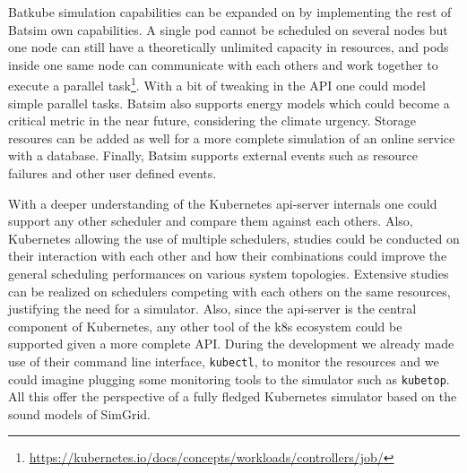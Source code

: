 Batkube simulation capabilities can be expanded on by implementing the rest of
Batsim own capabilities. A single pod cannot be scheduled on several nodes but
one node can still have a theoretically unlimited capacity in resources, and
pods inside one same node can communicate with each others and work together to
execute a parallel
task\footnote{\url{https://kubernetes.io/docs/concepts/workloads/controllers/job/}}.
With a bit of tweaking in the API one could model simple parallel tasks. Batsim
also supports energy models which could become a critical metric in the near
future, considering the climate urgency. Storage resoures can be added as well
for a more complete simulation of an online service with a database. Finally,
Batsim supports external events such as resource failures and other user
defined events.

With a deeper understanding of the Kubernetes api-server internals one could
support any other scheduler and compare them against each others. Also,
Kubernetes allowing the use of multiple schedulers, studies could be conducted
on their interaction with each other and how their combinations could improve
the general scheduling performances on various system topologies. Extensive
studies can be realized on schedulers competing with each others on the same
resources, justifying the need for a simulator. Also, since the api-server is
the central component of Kubernetes, any other tool of the k8s ecosystem could
be supported given a more complete API. During the development we already made
use of their command line interface, \texttt{kubectl}, to monitor the resources
and we could imagine plugging some monitoring tools to the simulator such as
\texttt{kubetop}. All this offer the perspective of a fully fledged Kubernetes
simulator based on the sound models of SimGrid.
